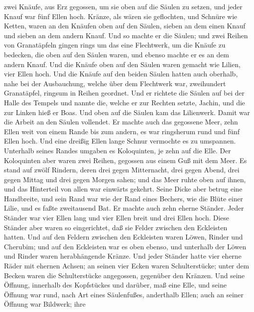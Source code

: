 zwei Knäufe, aus Erz gegossen, um sie oben auf die Säulen zu setzen, und
jeder Knauf war fünf Ellen hoch.  Kränze, als wären sie
geflochten, und Schnüre wie Ketten, waren an den Knäufen oben auf den
Säulen, sieben an dem einen Knauf und sieben an dem andern Knauf.
 Und so machte er die Säulen; und zwei Reihen von
Granatäpfeln gingen rings um das eine Flechtwerk, um die Knäufe zu
bedecken, die oben auf den Säulen waren, und ebenso machte er es an dem
andern Knauf.  Und die Knäufe oben auf den Säulen waren
gemacht wie Lilien, vier Ellen hoch.  Und die Knäufe auf
den beiden Säulen hatten auch oberhalb, nahe bei der Ausbauchung, welche
über dem Flechtwerk war, zweihundert Granatäpfel, ringsum in Reihen
geordnet.  Und er richtete die Säulen auf bei der Halle
des Tempels und nannte die, welche er zur Rechten setzte, Jachin, und
die zur Linken hieß er Boas.  Und oben auf die Säulen kam
das Lilienwerk. Damit war die Arbeit an den Säulen vollendet.
 Er machte auch das gegossene Meer, zehn Ellen weit von
einem Rande bis zum andern, es war ringsherum rund und fünf Ellen hoch.
Und eine dreißig Ellen lange Schnur vermochte es zu umspannen.
 Unterhalb seines Randes umgaben es Koloquinten, je zehn
auf die Elle. Der Koloquinten aber waren zwei Reihen, gegossen aus einem
Guß mit dem Meer.  Es stand auf zwölf Rindern, deren drei
gegen Mitternacht, drei gegen Abend, drei gegen Mittag und drei gegen
Morgen sahen; und das Meer ruhte oben auf ihnen, und das Hinterteil von
allen war einwärts gekehrt.  Seine Dicke aber betrug eine
Handbreite, und sein Rand war wie der Rand eines Bechers, wie die Blüte
einer Lilie, und es faßte zweitausend Bat.  Er machte
auch zehn eherne Ständer. Jeder Ständer war vier Ellen lang und vier
Ellen breit und drei Ellen hoch.  Diese Ständer aber
waren so eingerichtet, daß sie Felder zwischen den Eckleisten hatten.
 Und auf den Feldern zwischen den Eckleisten waren Löwen,
Rinder und Cherubim; und auf den Eckleisten war es oben ebenso, und
unterhalb der Löwen und Rinder waren herabhängende Kränze.
 Und jeder Ständer hatte vier eherne Räder mit ehernen
Achsen; an seinen vier Ecken waren Schulterstücke; unter dem Becken
waren die Schulterstücke angegossen, gegenüber den Kränzen.
 Und seine Öffnung, innerhalb des Kopfstückes und
darüber, maß eine Elle, und seine Öffnung war rund, nach Art eines
Säulenfußes, anderthalb Ellen; auch an seiner Öffnung war Bildwerk; ihre
